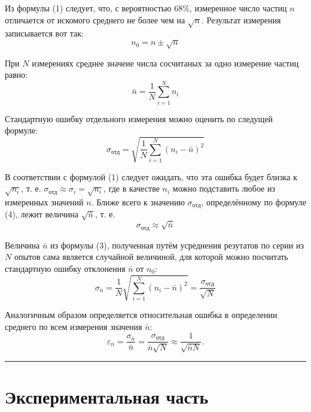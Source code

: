 \documentclass[a4paper,12pt]{article} %
\begin{document}
Из формулы (1) следует, что, с вероятностью 68\%, измеренное число частиц $n$ отличается от искомого среднего не более чем на $ \sqrt{n} $. Результат измерения записывается вот так:
\begin{equation}
n_0 = n \pm \sqrt{n}
\end{equation}

При $ N $ измерениях среднее значеие числа сосчитаных за одно измерение частиц равно:
\begin{equation}
\bar{n}=\frac{1}{N} \sum_{i=1}^{N} n_i
\end{equation}

Стандартную ошибку отдельного измерения можно оценить по следущей формуле:
\begin{equation}
\sigma_{отд} = \sqrt{\frac{1}{N}\sum_{i=1}^{N} \left( n_i - \bar{n} \right)^2}
\end{equation}

В соответствии с формулой (1) следует ожидать, что эта ошибка будет близка к $ \sqrt{n_i} $, т. е. $ \sigma_{отд} \approx \sigma_i = \sqrt{n_i} $, где в качестве $ n_i $ можно подставить любое из измеренных значений $ n $. Ближе всего к значению $ \sigma_{отд} $, определённому по формуле (4), лежит величина $ \sqrt{\bar{n}} $, т. е.
\begin{equation}
\sigma_{отд} \approx \sqrt{\bar{n}}
\end{equation}

Величина $ \bar{n} $ из формулы (3), полученная путём усреднения резутатов по серии из $ N $ опытов сама является случайной величиной, для которой можно посчитать стандартную ошибку отклонения $ \bar{n} $ от $ n_0 $:
\begin{equation}
\sigma_{\bar{n}}=\frac{1}{N}\sqrt{\sum_{i=1}^{N} \left( n_i - \bar{n} \right)^2} = \frac{\sigma_{отд}}{\sqrt{N}}
\end{equation}

Аналогичным образом определяется относительная ошибка в определении среднего по всем измерения значения $\bar{n}$:
\begin{equation}
\varepsilon_{\bar{n}}=\frac{\sigma_{\bar{n}}}{\bar{n}}=\frac{\sigma_{отд}}{\bar{n}\sqrt{N}} \approx \frac{1}{\sqrt{\bar{n}N}}.
\end{equation}

\medskip\hrule\medskip

\section{Экспериментальная часть}
\end{document}
